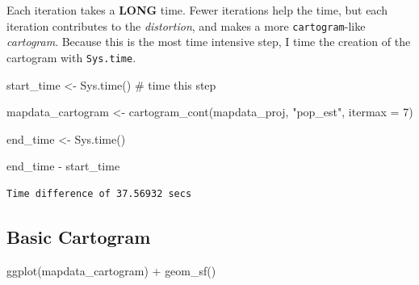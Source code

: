 \documentclass[
  letterpaper,
  DIV=11,
  numbers=noendperiod,
  oneside]{scrreprt}
\newenvironment{Shaded}{\begin{snugshade}}{\end{snugshade}}
\newcommand{\AttributeTok}[1]{\textcolor[rgb]{0.40,0.45,0.13}{#1}}
\newcommand{\CommentTok}[1]{\textcolor[rgb]{0.37,0.37,0.37}{#1}}
\newcommand{\DecValTok}[1]{\textcolor[rgb]{0.68,0.00,0.00}{#1}}
\newcommand{\FunctionTok}[1]{\textcolor[rgb]{0.28,0.35,0.67}{#1}}
\newcommand{\NormalTok}[1]{\textcolor[rgb]{0.00,0.23,0.31}{#1}}
\newcommand{\OtherTok}[1]{\textcolor[rgb]{0.00,0.23,0.31}{#1}}
\newcommand{\SpecialCharTok}[1]{\textcolor[rgb]{0.37,0.37,0.37}{#1}}
\newcommand{\StringTok}[1]{\textcolor[rgb]{0.13,0.47,0.30}{#1}}
\begin{document}
\begin{tcolorbox}[enhanced jigsaw, coltitle=black, breakable, leftrule=.75mm, opacityback=0, colback=white, bottomtitle=1mm, left=2mm, toptitle=1mm, toprule=.15mm, opacitybacktitle=0.6, rightrule=.15mm, titlerule=0mm, colframe=quarto-callout-tip-color-frame, bottomrule=.15mm, title=\textcolor{quarto-callout-tip-color}{\faLightbulb}\hspace{0.5em}{Tip}, colbacktitle=quarto-callout-tip-color!10!white, arc=.35mm]

Each iteration takes a \textbf{LONG} time. Fewer iterations help the
time, but each iteration contributes to the \emph{distortion}, and makes
a more \texttt{cartogram}-like \emph{cartogram}. Because this is the
most time intensive step, I time the creation of the cartogram with
\texttt{Sys.time}.

\end{tcolorbox}

\begin{Shaded}
\begin{Highlighting}[]
\NormalTok{start\_time }\OtherTok{\textless{}{-}} \FunctionTok{Sys.time}\NormalTok{() }\CommentTok{\# time this step}

\NormalTok{mapdata\_cartogram }\OtherTok{\textless{}{-}} \FunctionTok{cartogram\_cont}\NormalTok{(mapdata\_proj, }
                                  \StringTok{"pop\_est"}\NormalTok{, }
                                  \AttributeTok{itermax =} \DecValTok{7}\NormalTok{)}

\NormalTok{end\_time }\OtherTok{\textless{}{-}} \FunctionTok{Sys.time}\NormalTok{()}

\NormalTok{end\_time }\SpecialCharTok{{-}}\NormalTok{ start\_time}
\end{Highlighting}
\end{Shaded}

\begin{verbatim}
Time difference of 37.56932 secs
\end{verbatim}

\subsection{Basic Cartogram}\label{basic-cartogram}

\begin{Shaded}
\begin{Highlighting}[]
\FunctionTok{ggplot}\NormalTok{(mapdata\_cartogram) }\SpecialCharTok{+} 
  \FunctionTok{geom\_sf}\NormalTok{()}
\end{Highlighting}
\end{Shaded}
\end{document}
